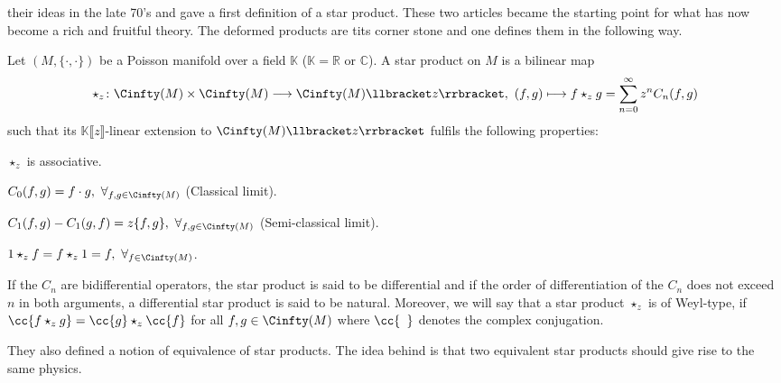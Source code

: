 their ideas in the late 70's \cite{bayen.et.al:1977a, bayen.et.al:1978a} and 
gave a first definition of a star product. These two articles became the starting 
point for what has now become a rich and fruitful theory. The deformed products 
are tits corner stone and one defines them in the following way.
\begin{definition}
	\label{Def:StarProduct}
	Let $(M, \{\cdot, \cdot\})$ be a Poisson manifold over a field 
	$\mathbb{K}$ ($\mathbb{K} = \mathbb{R}$ or $\mathbb{C}$).
	A star product on $M$ is a bilinear map
	\begin{equation*}
	    \star_z \colon 
    	\Cinfty(M) 
    	\times 
	    \Cinfty(M) 
	    \longrightarrow
	    \Cinfty(M) \llbracket z \rrbracket
	    , \
	    (f,g) 
	    \longmapsto 
	    f \star_z g 
	    =
	    \sum\limits_{n = 0}^\infty 
	    z^n C_n(f,g)
	\end{equation*}
	such that its $\mathbb{K}\llbracket z \rrbracket$-linear extension to 
	$\Cinfty(M) \llbracket z \rrbracket$ fulfils the following properties:
	\begin{definitionlist}
		\item
		$\star_z$ is associative.
		
		\item
		$C_0(f, g) = f \cdot g,\ \forall_{f,g \in \Cinfty(M)}$ (Classical limit).
		
		\item
		$C_1(f, g) - C_1(g, f)= z \{f, g\},\ \forall_{f,g \in \Cinfty(M)}$
		(Semi-classical limit).
		
		\item
		$1 \star_z f = f \star_z 1 = f,\ \forall_{f \in \Cinfty(M)}$.
	\end{definitionlist}
	If the $C_n$ are bidifferential operators, the star product is said to be 
	differential and if the order of differentiation of the $C_n$ does not 
	exceed $n$ in both arguments, a differential star product is said to be 
	natural. Moreover, we will say that a star product $\star_z$ is of Weyl-type,
	if $\cc{f \star_z g} = \cc{g} \star_z \cc{f}$ for all $f,g \in \Cinfty(M)$
	where $\cc{\phantom{a}}$ denotes the complex conjugation.
\end{definition}
They also defined a notion of equivalence of star products. The idea behind is 
that two equivalent star products should give rise to the same physics.
